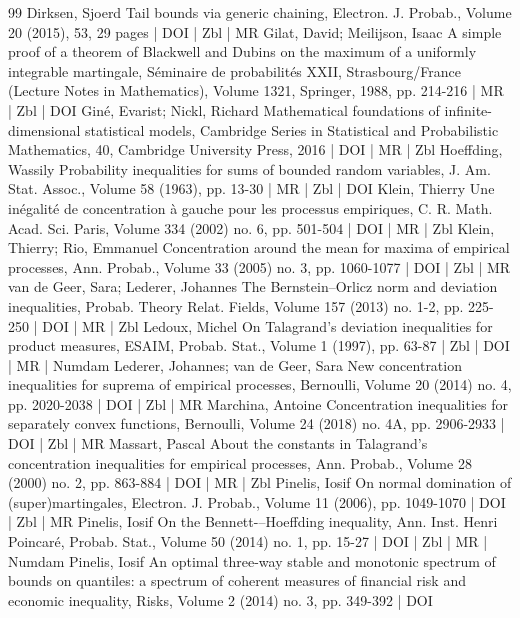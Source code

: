 \documentclass[10pt]{amsart}
\theoremstyle{definition}\newtheorem{defi}[theo]{Definition}\newtheorem{rema}[theo]{Remark}\newtheorem{exam}[theo]{Example}\newtheorem{exem}[theo]{Example}\newtheorem{nota}[theo]{Notation}
\begin{document}
\begin{thebibliography}{99}
Dirksen, Sjoerd Tail bounds via generic chaining, Electron. J. Probab., Volume 20 (2015), 53, 29 pages | DOI | Zbl | MR
Gilat, David; Meilijson, Isaac A simple proof of a theorem of Blackwell and Dubins on the maximum of a uniformly integrable martingale, Séminaire de probabilités XXII, Strasbourg/France (Lecture Notes in Mathematics), Volume 1321, Springer, 1988, pp. 214-216 | MR | Zbl | DOI
Giné, Evarist; Nickl, Richard Mathematical foundations of infinite-dimensional statistical models, Cambridge Series in Statistical and Probabilistic Mathematics, 40, Cambridge University Press, 2016 | DOI | MR | Zbl
Hoeffding, Wassily Probability inequalities for sums of bounded random variables, J. Am. Stat. Assoc., Volume 58 (1963), pp. 13-30 | MR | Zbl | DOI
Klein, Thierry Une inégalité de concentration à gauche pour les processus empiriques, C. R. Math. Acad. Sci. Paris, Volume 334 (2002) no. 6, pp. 501-504 | DOI | MR | Zbl
Klein, Thierry; Rio, Emmanuel Concentration around the mean for maxima of empirical processes, Ann. Probab., Volume 33 (2005) no. 3, pp. 1060-1077 | DOI | Zbl | MR
van de Geer, Sara; Lederer, Johannes The Bernstein–Orlicz norm and deviation inequalities, Probab. Theory Relat. Fields, Volume 157 (2013) no. 1-2, pp. 225-250 | DOI | MR | Zbl
Ledoux, Michel On Talagrand’s deviation inequalities for product measures, ESAIM, Probab. Stat., Volume 1 (1997), pp. 63-87 | Zbl | DOI | MR | Numdam
Lederer, Johannes; van de Geer, Sara New concentration inequalities for suprema of empirical processes, Bernoulli, Volume 20 (2014) no. 4, pp. 2020-2038 | DOI | Zbl | MR
Marchina, Antoine Concentration inequalities for separately convex functions, Bernoulli, Volume 24 (2018) no. 4A, pp. 2906-2933 | DOI | Zbl | MR
Massart, Pascal About the constants in Talagrand’s concentration inequalities for empirical processes, Ann. Probab., Volume 28 (2000) no. 2, pp. 863-884 | DOI | MR | Zbl
Pinelis, Iosif On normal domination of (super)martingales, Electron. J. Probab., Volume 11 (2006), pp. 1049-1070 | DOI | Zbl | MR
Pinelis, Iosif On the Bennett-–Hoeffding inequality, Ann. Inst. Henri Poincaré, Probab. Stat., Volume 50 (2014) no. 1, pp. 15-27 | DOI | Zbl | MR | Numdam
Pinelis, Iosif An optimal three-way stable and monotonic spectrum of bounds on quantiles: a spectrum of coherent measures of financial risk and economic inequality, Risks, Volume 2 (2014) no. 3, pp. 349-392 | DOI

\end{thebibliography}
\end{document}
